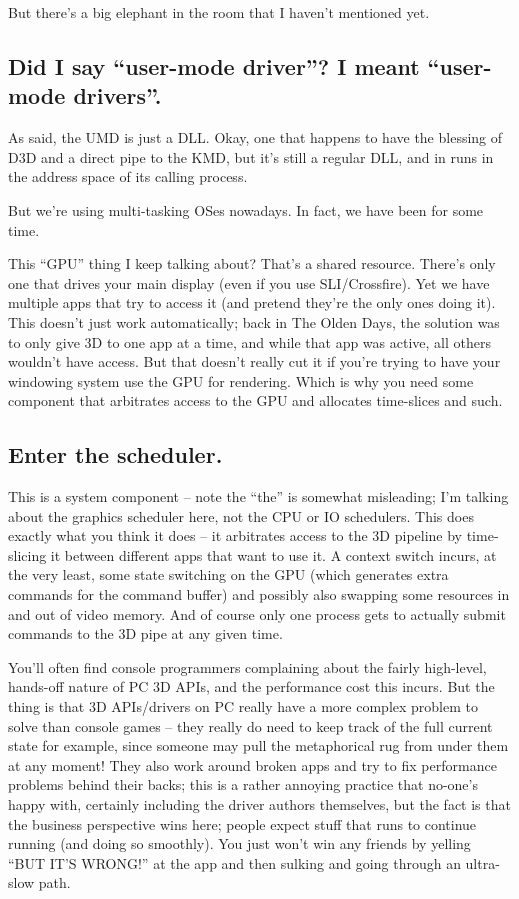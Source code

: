 \documentclass[12pt]{article}
\begin{document}
But there’s a big elephant in the room that I haven’t mentioned yet.

\subsection{Did I say “user-mode driver”? I meant “user-mode drivers”.}
\label{sec:orga1b46a0}
As said, the UMD is just a DLL.
Okay, one that happens to have the blessing of D3D and a direct pipe to the KMD, but it’s still a regular DLL, and in runs in the address space of its calling process.

But we’re using multi-tasking OSes nowadays.
In fact, we have been for some time.

This “GPU” thing I keep talking about? That’s a shared resource.
There’s only one that drives your main display (even if you use SLI/Crossfire).
Yet we have multiple apps that try to access it (and pretend they’re the only ones doing it).
This doesn’t just work automatically; back in The Olden Days, the solution was to only give 3D to one app at a time, and while that app was active, all others wouldn’t have access.
But that doesn’t really cut it if you’re trying to have your windowing system use the GPU for rendering.
Which is why you need some component that arbitrates access to the GPU and allocates time-slices and such.

\subsection{Enter the scheduler.}
\label{sec:org851752f}
This is a system component – note the “the” is somewhat misleading; I’m talking about the graphics scheduler here, not the CPU or IO schedulers.
This does exactly what you think it does – it arbitrates access to the 3D pipeline by time-slicing it between different apps that want to use it.
A context switch incurs, at the very least, some state switching on the GPU (which generates extra commands for the command buffer) and possibly also swapping some resources in and out of video memory.
And of course only one process gets to actually submit commands to the 3D pipe at any given time.

You’ll often find console programmers complaining about the fairly high-level, hands-off nature of PC 3D APIs, and the performance cost this incurs.
But the thing is that 3D APIs/drivers on PC really have a more complex problem to solve than console games – they really do need to keep track of the full current state for example, since someone may pull the metaphorical rug from under them at any moment! They also work around broken apps and try to fix performance problems behind their backs; this is a rather annoying practice that no-one’s happy with, certainly including the driver authors themselves, but the fact is that the business perspective wins here; people expect stuff that runs to continue running (and doing so smoothly).
You just won’t win any friends by yelling “BUT IT’S WRONG!” at the app and then sulking and going through an ultra-slow path.
\end{document}

